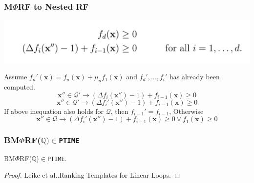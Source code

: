 \documentclass[11pt]{beamer}
\begin{document}
\begin{frame}\frametitle{M$\Phi$RF to Nested RF}
\begin{center}
\includegraphics[scale = 0.2]{6.PNG}
\end{center}

Assume $f_{n}'(\textbf{x})= f_{n}(\textbf{x}) + \mu_{n}f_1(\textbf{x})$ and $f_d', \ldots, f_{i}'$ has already been computed.
\[\textbf{x}''\in \mathcal{Q}' \rightarrow (\Delta f_i(\textbf{x}'') - 1) + f_{i-1}(\textbf{x}) \ge 0\]
\[\textbf{x}''\in \mathcal{Q}' \rightarrow (\Delta f_i'(\textbf{x}'') - 1) + f_{i-1}(\textbf{x}) \ge 0\]
If above inequation also holds for $\mathcal{Q}$, then $f_{i-1}' = f_{i-1}$, Otherwise
\[\textbf{x}''\in \mathcal{Q} \rightarrow (\Delta f_i'(\textbf{x}'') - 1) + f_{i-1}(\textbf{x}) \ge 0 \vee f_1(\textbf{x}) \ge 0\]


\end{frame}
\fi
\begin{frame}\frametitle{BM$\Phi$RF($\mathbb{Q})\in$\texttt{PTIME}}
\begin{theorem}[2]
BM$\Phi$RF($\mathbb{Q}$)$\in$\texttt{PTIME}.



\end{theorem}

\begin{proof}
Leike et al..Ranking Templates for Linear Loops. 

\end{proof}
\end{frame}
\end{document}
